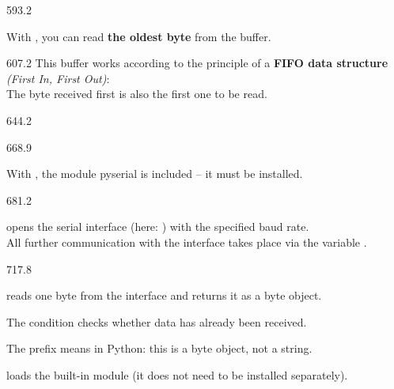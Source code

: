 \documentclass{aslab}
\begin{document}
\begin{region}[x=68.7,right=0]{593.2}
\begin{dashlist}
\item With , you can read \textbf{the oldest byte} from the
  buffer.
\end{dashlist}
\end{region}

\begin{region}[pitch=12.1]{607.2}
This buffer works according to the principle of a \textbf{FIFO data
structure} \textit{(First In, First Out)}:\\
The byte received first is also the first one to be read.
\end{region}

\begin{region}{644.2}
\end{region}

\begin{region}[x=68.7,right=0]{668.9}
\begin{dashlist}
\item With , the module pyserial is included -- it must
  be installed.
\end{dashlist}
\end{region}

\begin{region}[x=68.7,right=0,pitch=12.45,free]{681.2}
\begin{dashlist}
\item {} opens the serial interface (here:
  ) with the specified baud rate.\\
  All further communication with the interface takes place via the
  variable .
\end{dashlist}
\end{region}

\begin{region}[x=68.7,right=0,pitch=12.33,free]{717.8}
\begin{dashlist}
\item {} reads one byte from the interface and returns it as
  a byte object.
\item The condition  checks whether data has
  already been received.
\item The prefix  means in Python: this is a byte object, not a
  string.
\item {} loads the built-in module  (it does not
  need to be installed separately).
\end{dashlist}
\end{region}
\end{document}
